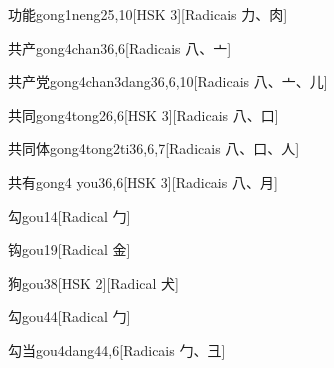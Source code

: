\begin{entry}{功能}{gong1neng2}{5,10}[HSK 3][Radicais ⼒、⾁]
\end{entry}

\begin{entry}{共产}{gong4chan3}{6,6}[Radicais ⼋、⼇]
\end{entry}

\begin{entry}{共产党}{gong4chan3dang3}{6,6,10}[Radicais ⼋、⼇、⼉]
\end{entry}

\begin{entry}{共同}{gong4tong2}{6,6}[HSK 3][Radicais ⼋、⼝]
\end{entry}

\begin{entry}{共同体}{gong4tong2ti3}{6,6,7}[Radicais ⼋、⼝、⼈]
\end{entry}

\begin{entry}{共有}{gong4 you3}{6,6}[HSK 3][Radicais ⼋、⽉]
\end{entry}

\begin{entry}{勾}{gou1}{4}[Radical ⼓]
\end{entry}

\begin{entry}{钩}{gou1}{9}[Radical ⾦]
\end{entry}

\begin{entry}{狗}{gou3}{8}[HSK 2][Radical ⽝]
\end{entry}

\begin{entry}{勾}{gou4}{4}[Radical ⼓]
\end{entry}

\begin{entry}{勾当}{gou4dang4}{4,6}[Radicais ⼓、⼹]
\end{entry}

